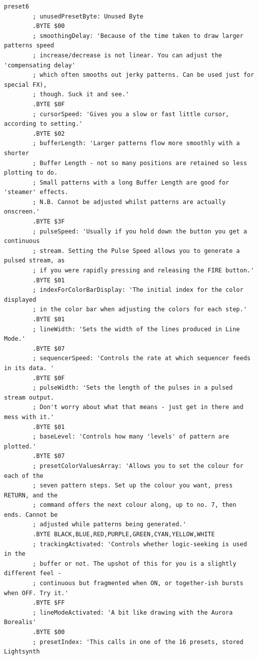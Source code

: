 \begin{lstlisting}[basicstyle=\ttfamily\tiny,caption=Source code for Preset 6.]
preset6
        ; unusedPresetByte: Unused Byte
        .BYTE $00
        ; smoothingDelay: 'Because of the time taken to draw larger patterns speed
        ; increase/decrease is not linear. You can adjust the 'compensating delay'
        ; which often smooths out jerky patterns. Can be used just for special FX),
        ; though. Suck it and see.'
        .BYTE $0F
        ; cursorSpeed: 'Gives you a slow or fast little cursor, according to setting.'
        .BYTE $02
        ; bufferLength: 'Larger patterns flow more smoothly with a shorter
        ; Buffer Length - not so many positions are retained so less plotting to do.
        ; Small patterns with a long Buffer Length are good for 'steamer' effects.
        ; N.B. Cannot be adjusted whilst patterns are actually onscreen.'
        .BYTE $3F
        ; pulseSpeed: 'Usually if you hold down the button you get a continuous
        ; stream. Setting the Pulse Speed allows you to generate a pulsed stream, as
        ; if you were rapidly pressing and releasing the FIRE button.'
        .BYTE $01
        ; indexForColorBarDisplay: 'The initial index for the color displayed
        ; in the color bar when adjusting the colors for each step.'
        .BYTE $01
        ; lineWidth: 'Sets the width of the lines produced in Line Mode.'
        .BYTE $07
        ; sequencerSpeed: 'Controls the rate at which sequencer feeds in its data. '
        .BYTE $0F
        ; pulseWidth: 'Sets the length of the pulses in a pulsed stream output.
        ; Don't worry about what that means - just get in there and mess with it.'
        .BYTE $01
        ; baseLevel: 'Controls how many 'levels' of pattern are plotted.'
        .BYTE $07
        ; presetColorValuesArray: 'Allows you to set the colour for each of the
        ; seven pattern steps. Set up the colour you want, press RETURN, and the
        ; command offers the next colour along, up to no. 7, then ends. Cannot be
        ; adjusted while patterns being generated.'
        .BYTE BLACK,BLUE,RED,PURPLE,GREEN,CYAN,YELLOW,WHITE
        ; trackingActivated: 'Controls whether logic-seeking is used in the
        ; buffer or not. The upshot of this for you is a slightly different feel -
        ; continuous but fragmented when ON, or together-ish bursts when OFF. Try it.'
        .BYTE $FF
        ; lineModeActivated: 'A bit like drawing with the Aurora Borealis'
        .BYTE $00
        ; presetIndex: 'This calls in one of the 16 presets, stored Lightsynth

\end{lstlisting}
